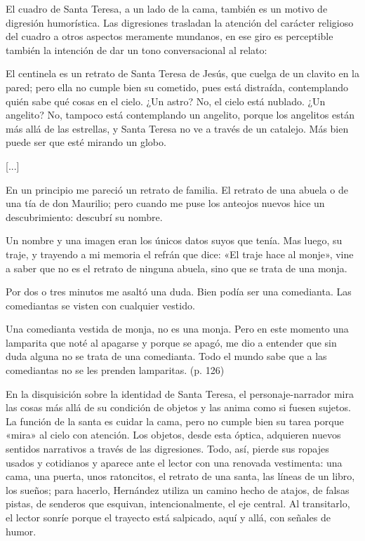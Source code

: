 \documentclass[14pt,twoside,final]{extbook} %
\begin{document}
El cuadro de Santa Teresa, a un lado de la cama, también es un motivo de digresión humorística. Las digresiones trasladan la atención del carácter religioso del cuadro a otros aspectos meramente mundanos, en ese giro es perceptible también la intención de dar un tono conversacional al relato:
\begin{quoting}
El centinela es un retrato de Santa Teresa de Jesús, que cuelga de un clavito en la pared; pero ella no cumple bien su cometido, pues está distraída, contemplando quién sabe qué cosas en el cielo. ¿Un astro? No, el cielo está nublado. ¿Un angelito? No, tampoco está contemplando un angelito, porque los angelitos están más allá de las estrellas, y Santa Teresa no ve a través de un catalejo. Más bien puede ser que esté mirando un globo.

\centerline{[...]}

En un principio me pareció un retrato de familia. El retrato de una abuela o de una tía de don Maurilio; pero cuando me puse los anteojos nuevos hice un descubrimiento: descubrí su nombre.

Un nombre y una imagen eran los únicos datos suyos que tenía. Mas luego, su traje, y trayendo a mi memoria el refrán que dice: «El traje hace al monje», vine a saber que no es el retrato de ninguna abuela, sino que se trata de una monja.

Por dos o tres minutos me asaltó una duda. Bien podía ser una comedianta. Las comediantas se visten con cualquier vestido.

Una comedianta vestida de monja, no es una monja. Pero en este momento una lamparita que noté al apagarse y porque se apagó, me dio a entender que sin duda alguna no se trata de una comedianta. Todo el mundo sabe que a las comediantas no se les prenden lamparitas. (p. 126)
\end{quoting}
En la disquisición sobre la identidad de Santa Teresa, el personaje-narrador mira las cosas más allá de su condición de objetos y las anima como si fuesen sujetos. La función de la santa es cuidar la cama, pero no cumple bien su tarea porque «mira» al cielo con atención. Los objetos, desde esta óptica, adquieren nuevos sentidos narrativos a través de las digresiones. Todo, así, pierde sus ropajes usados y cotidianos y aparece ante el lector con una renovada vestimenta: una cama, una puerta, unos ratoncitos, el retrato de una santa, las líneas de un libro, los sueños; para hacerlo, Hernández utiliza un camino hecho de atajos, de falsas pistas, de senderos que esquivan, intencionalmente, el eje central. Al transitarlo, el lector sonríe porque el trayecto está salpicado, aquí y allá, con señales de humor.
\end{document}
